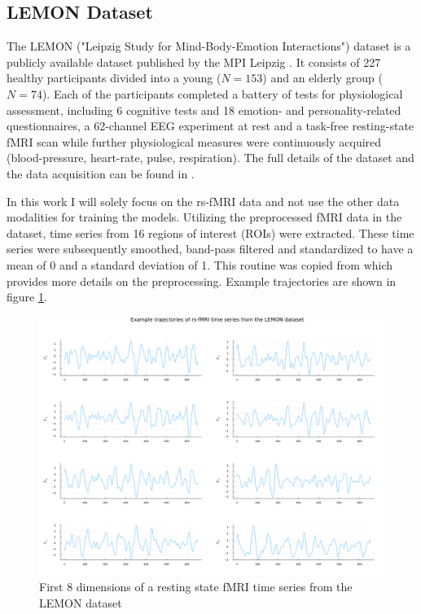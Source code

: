 \subsection{LEMON Dataset}

The LEMON ("Leipzig Study for Mind-Body-Emotion Interactions") dataset is a publicly available dataset published by the MPI Leipzig \cite{babayan2019mind}. 
It consists of 227 healthy participants divided into a young ($N=153$) and an elderly group ($N=74$). Each of the participants completed a battery of tests for
physiological assessment, including 6 cognitive tests and 18 emotion- and personality-related questionnaires, a 62-channel EEG experiment at rest and 
a task-free resting-state fMRI scan while further physiological measures were continuously acquired (blood-pressure, heart-rate, pulse, respiration). The full details of 
the dataset and the data acquisition can be found in \cite{babayan2019mind}.

In this work I will solely focus on the rs-fMRI data and not use the other data modalities for training the models. Utilizing the preprocessed fMRI data in the dataset,
time series from 16 regions of interest (ROIs) were extracted. These time series were subsequently smoothed, band-pass filtered and standardized to have a mean of 0 and
a standard deviation of 1. This routine was copied from \cite{koppe2019identifying} which provides more details on the preprocessing.
Example trajectories are shown in figure \ref{fig:fmri_example}.

\begin{figure}
    \includegraphics[width=\textwidth]{Images/fmri_example_traj.png}
    \caption[Example trajectories of fMRI time series]{First 8 dimensions of a resting state fMRI time series from the LEMON dataset}
    \label{fig:fmri_example}

\end{figure}

